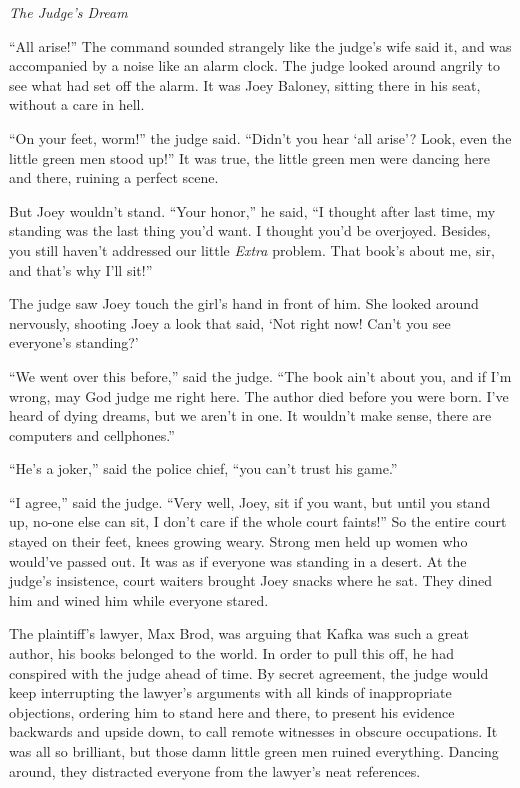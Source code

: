 \documentclass[oneside]{book}
\begin{document}
\vspace{2mm}
\noindent \textit{The Judge's Dream}
\vspace{2mm}

``All arise!'' The command sounded strangely like the judge's wife said it, and
was accompanied by a noise like an alarm clock.  The judge looked around
angrily to see what had set off the alarm.  It was Joey Baloney, sitting
there in his seat, without a care in hell.

``On your feet, worm!'' the judge said.  ``Didn't you hear `all arise'?  Look,
even the little green men stood up!''  It was true, the little green men
were dancing here and there, ruining a perfect scene.

But Joey wouldn't stand.  ``Your honor,'' he said, ``I thought after last time,
my standing was the last thing you'd want.  I thought you'd be overjoyed.
Besides, you still haven't addressed our little \emph{Extra}
problem.  That book's about me, sir, and that's why I'll sit!''

The judge saw Joey touch the girl's hand in front of him.  She looked around
nervously, shooting Joey a look that said, `Not right now!  Can't you see everyone's
standing?'

``We went over this before,'' said the judge.  ``The book ain't about you,
and if I'm wrong, may God judge me right here.  The author died before you were born.
I've heard of dying dreams, but we aren't in one.
It wouldn't make sense, there are computers and cellphones.''

``He's a joker,'' said the police chief, ``you can't trust his game.''

``I agree,'' said the judge.  ``Very well, Joey, sit if you want, but until you
stand up, no-one else can sit, I don't care if the whole court faints!''  So
the entire court stayed on their feet, knees growing weary.  Strong men held up
women who would've passed out.  It was as if everyone was standing in a desert.
At the judge's insistence, court waiters brought Joey snacks where
he sat.  They dined him and wined him while everyone stared.

The plaintiff's lawyer, Max Brod, was arguing that Kafka was such a great
author, his books belonged to the world.  In order to pull this off, he had
conspired with the judge ahead of time.  By secret agreement, the judge would
keep interrupting the lawyer's arguments with all kinds of inappropriate objections,
ordering him to stand here and there, to present his evidence backwards and
upside down, to call remote witnesses in obscure occupations.  It was all so
brilliant, but those damn little green men ruined everything.  Dancing around,
they distracted everyone from the lawyer's neat references.
\end{document}
